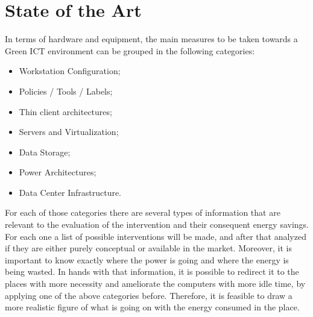

\chapter{State of the Art} \label{chap2:state_of_the_art}
    In terms of hardware and equipment, the main measures to be taken towards a Green ICT environment can be grouped in the following categories:%
    \begin{itemize}
        \item Workstation Configuration;
        \item Policies / Tools / Labels;
        \item Thin client architectures;
        \item Servers and Virtualization;
        \item Data Storage;
        \item Power Architectures;
        \item Data Center Infrastructure.
    \end{itemize}
    
    For each of those categories there are several types of information that are relevant to the evaluation of the intervention and their consequent energy savings. For each one a list of possible interventions will be made, and after that analyzed if they are either purely conceptual or available in the market. Moreover, it is important to know exactly where the power is going and where the energy is being wasted. In hands with that information, it is possible to redirect it to the places with more necessity and ameliorate the computers with more idle time, by applying one of the above categories before. Therefore, it is feasible to draw a more realistic figure of what is going on with the energy consumed in the place.
    
